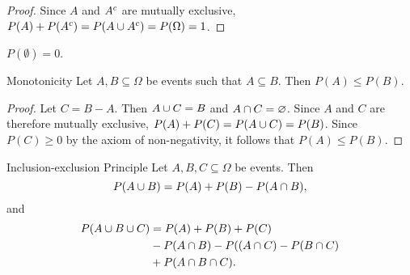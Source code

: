 \begin{proof}
    Since $A$ and $A^{c}$ are mutually exclusive, $P(A) + P(A^{c}) = P(A \cup A^{c}) = P(\Omega) = 1$.
\end{proof}

\begin{cor}
    $P(\emptyset) = 0$.
\end{cor}

\begin{prop}Monotonicity\label{probability-monotonicity}\proofbreak
    Let $A, B \subseteq \Omega$ be events such that $A \subseteq B$. Then $P(A) \leq P(B)$.
\end{prop}

\begin{proof}
    Let $C = B - A$. Then $A \cup C = B$ and $A \cap C = \varnothing$. Since $A$ and $C$ are therefore mutually exclusive, $P(A) + P(C) = P(A \cup C) = P(B)$. Since $P(C) \geq 0$ by the axiom of non-negativity, it follows that $P(A) \leq P(B)$.
\end{proof}

\begin{thm}{Inclusion-exclusion Principle}\label{inclusion-exclusion-probability}\proofbreak
    Let $A, B, C \subseteq \Omega$ be events. Then
    \[P(A \cup B) = P(A) + P(B) - P(A \cap B),\]
    and
    \begin{align*}
        P(A \cup B \cup C) &= P(A) + P(B) + P(C) \\
                               &- P(A \cap B) - P((A \cap C) - P(B \cap C) \\
                               &+ P(A \cap B \cap C).
    \end{align*}
\end{thm}

